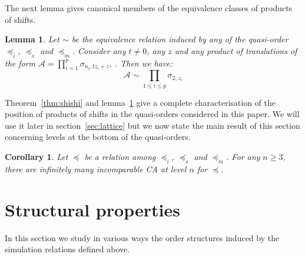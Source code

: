 \documentclass[a4paper]{elsarticle}
\def\qed{\relax\ifmmode\hskip2em \blacksquare\else\unskip\nobreak\hfill\hskip1em $\blacksquare$\fi}
\newcommand{\ACA}{\mathcal{A}}
\newcommand{\ACB}{\mathcal{B}}
\newcommand\sac{\sqsubseteq}
\newcommand{\fac}{\trianglelefteq}
\newcommand\bulk[2]{{#1}^{\left\langle{#2}\right\rangle}}
\newcommand{\simu}{\preccurlyeq}
\newcommand{\sacsimu}{\simu_i}
\newcommand{\facsimu}{\simu_s}
\newcommand{\facsacsimu}{\simu_m}
\newcommand{\sime}{\sim}
\newcommand\shi[2]{\sigma_{{#1},{#2}}}
\newtheorem{lm}{Lemma}[section]
\newtheorem{cor}{Corollary}[section]
\begin{document}
The next lemma gives canonical members of the equivalence classes of
products of shifts.

\begin{lm}
  \label{lm:canoshi}
  Let $\sime$ be the equivalence relation induced by any of the
  quasi-order $\sacsimu$, $\facsimu$ and $\facsacsimu$.  Consider any
  ${t\not=0}$, any $z$ and any product of translations of the form
  $\ACA=\prod_{i=1}^p \shi{n_i}{tz_i+z}$, . Then we have:
  \[\ACA\sime\prod_{1\leq i\leq p} \shi{2}{z_i}\]
\end{lm}


Theorem~\ref{thm:shishi} and lemma~\ref{lm:canoshi} give a complete
characterisation of the position of products of shifts in the
quasi-orders considered in this paper. We will use it later in
section~\ref{sec:lattice} but we now state the main result of this
section concerning levels at the bottom of the quasi-orders.

\begin{cor}
  \label{cor:infinishi}
  Let $\simu$ be a relation among $\sacsimu$, $\facsimu$ and
  $\facsacsimu$. For any ${n\geq3}$, there are infinitely many
  incomparable CA at level $n$ for $\simu$.
\end{cor}


\section{Structural properties}
\label{sec:sp}

In this section we study in various ways the order structures induced
by the simulation relations defined above.
\end{document}
